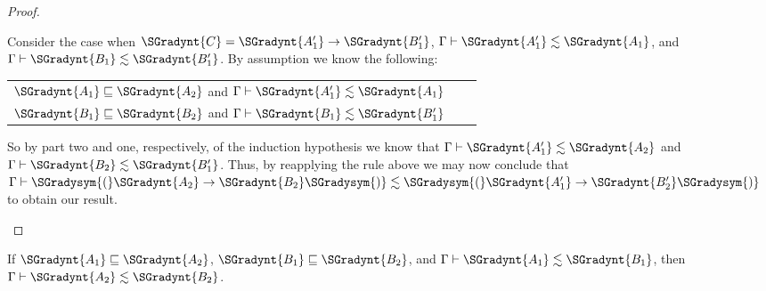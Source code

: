 \begin{proof}
\begin{itemize}
    Consider the case when $\SGradynt{C} = \SGradynt{A'_{{\mathrm{1}}}}  \rightarrow  \SGradynt{B'_{{\mathrm{1}}}}$, $ \Gamma  \vdash  \SGradynt{A'_{{\mathrm{1}}}}  \lesssim  \SGradynt{A_{{\mathrm{1}}}} $, and $ \Gamma  \vdash  \SGradynt{B_{{\mathrm{1}}}}  \lesssim  \SGradynt{B'_{{\mathrm{1}}}} $.
    By assumption we know the following:
    \begin{center}
      \begin{tabular}{lll}
        $ \SGradynt{A_{{\mathrm{1}}}}  \sqsubseteq  \SGradynt{A_{{\mathrm{2}}}} $ and $ \Gamma  \vdash  \SGradynt{A'_{{\mathrm{1}}}}  \lesssim  \SGradynt{A_{{\mathrm{1}}}} $\\
        $ \SGradynt{B_{{\mathrm{1}}}}  \sqsubseteq  \SGradynt{B_{{\mathrm{2}}}} $ and $ \Gamma  \vdash  \SGradynt{B_{{\mathrm{1}}}}  \lesssim  \SGradynt{B'_{{\mathrm{1}}}} $
      \end{tabular}
    \end{center}
    So by part two and one, respectively, of the induction hypothesis we know
    that $ \Gamma  \vdash  \SGradynt{A'_{{\mathrm{1}}}}  \lesssim  \SGradynt{A_{{\mathrm{2}}}} $ and $ \Gamma  \vdash  \SGradynt{B_{{\mathrm{2}}}}  \lesssim  \SGradynt{B'_{{\mathrm{1}}}} $.  Thus, by reapplying the rule above
    we may now conclude that $ \Gamma  \vdash  \SGradysym{(}  \SGradynt{A_{{\mathrm{2}}}}  \rightarrow  \SGradynt{B_{{\mathrm{2}}}}  \SGradysym{)}  \lesssim  \SGradysym{(}  \SGradynt{A'_{{\mathrm{1}}}}  \rightarrow  \SGradynt{B'_{{\mathrm{2}}}}  \SGradysym{)} $ to obtain our result.
  \end{itemize}
\end{proof}

\begin{corollary}
  \label{corollary:congruence_of_subtyping_along_type_precision}
  If $ \SGradynt{A_{{\mathrm{1}}}}  \sqsubseteq  \SGradynt{A_{{\mathrm{2}}}} $, $ \SGradynt{B_{{\mathrm{1}}}}  \sqsubseteq  \SGradynt{B_{{\mathrm{2}}}} $, and $ \Gamma  \vdash  \SGradynt{A_{{\mathrm{1}}}}  \lesssim  \SGradynt{B_{{\mathrm{1}}}} $, then $ \Gamma  \vdash  \SGradynt{A_{{\mathrm{2}}}}  \lesssim  \SGradynt{B_{{\mathrm{2}}}} $.
\end{corollary}

